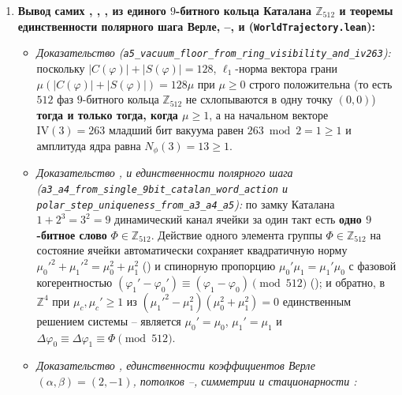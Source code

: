 \begin{enumerate}[nosep,leftmargin=*]
\item \textbf{Вывод самих , , ,  из единого $9$-битного кольца Каталана $\mathbb{Z}_{512}$ и теоремы единственности полярного шага Верле, --,  и  (\texttt{WorldTrajectory.lean}):}
  \begin{itemize}[nosep,leftmargin=*]
  \item \emph{Доказательство  (\texttt{a5\_\allowbreak vacuum\_\allowbreak floor\_\allowbreak from\_\allowbreak ring\_\allowbreak visibility\_\allowbreak and\_\allowbreak iv263}):}
    поскольку $|C(\varphi)|+|S(\varphi)|=128$, $\ell_1$-норма вектора грани $\mu(|C(\varphi)|+|S(\varphi)|)=128\mu$ при $\mu\ge 0$ строго положительна (то есть $512$ фаз $9$-битного кольца $\mathbb{Z}_{512}$ не схлопываются в одну точку $(0,0)$) \textbf{тогда и только тогда, когда $\mu\ge 1$}, а на начальном векторе $\mathrm{IV}(3)=263$ младший бит вакуума равен $263\bmod 2 = 1\ge 1$ и амплитуда ядра равна $N_\phi(3)=13\ge 1$.
  \item \emph{Доказательство ,  и единственности полярного шага (\texttt{a3\_\allowbreak a4\_\allowbreak from\_\allowbreak single\_\allowbreak 9bit\_\allowbreak catalan\_\allowbreak word\_\allowbreak action} и \texttt{polar\_\allowbreak step\_\allowbreak uniqueness\_\allowbreak from\_\allowbreak a3\_\allowbreak a4\_\allowbreak a5}):}
    по замку Каталана $1+2^3=3^2=9$ динамический канал ячейки за один такт есть \textbf{одно $9$-битное слово} $\Phi\in\mathbb{Z}_{512}$. Действие одного элемента группы $\Phi\in\mathbb{Z}_{512}$ на состояние ячейки автоматически сохраняет квадратичную норму $\mu_0'^2+\mu_1'^2=\mu_0^2+\mu_1^2$ () и спинорную пропорцию $\mu_0'\mu_1=\mu_1'\mu_0$ с фазовой когерентностью $(\varphi_1'-\varphi_0')\equiv(\varphi_1-\varphi_0)\pmod{512}$ (); и обратно, в $\mathbb{Z}^4$ при $\mu_c,\mu_c'\ge 1$ из $(\mu_1'^2-\mu_1^2)(\mu_0^2+\mu_1^2)=0$ единственным решением системы -- является $\mu_0'=\mu_0$, $\mu_1'=\mu_1$ и $\Delta\varphi_0\equiv\Delta\varphi_1\equiv\Phi\pmod{512}$.
  \item \emph{Доказательство , единственности коэффициентов Верле $(\alpha,\beta)=(2,-1)$, потолков --, симметрии  и стационарности :}

\end{itemize}
\end{enumerate}
